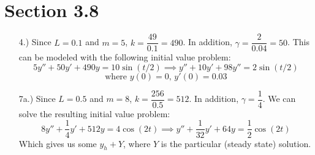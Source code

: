 \documentclass[12pt]{article}
\begin{document}
\section*{Section 3.8}
\begin{itemize}
    \item [4.)] Since $L=0.1$ and $m=5$, $k=\dfrac{49}{0.1}=490$. In addition, $\gamma=\dfrac{2}{0.04}=50$. This can be modeled with the following initial value problem:
    \[5y''+50y'+490y=10\sin(t/2)\implies y''+10y'+98y''=2\sin(t/2)\]
    \[\text{where }y(0)=0,\,y'(0)=0.03\]

    \item [7a.)] Since $L=0.5$ and $m=8$, $k=\dfrac{256}{0.5}=512$. In addition, $\gamma=\dfrac{1}{4}$. We can solve the resulting initial value problem:
    \[8y''+\frac{1}{4}y'+512y=4\cos(2t)\implies y''+\frac{1}{32}y'+64y=\frac{1}{2}\cos(2t)\]
    Which gives us some $y_h+Y$, where $Y$ is the particular (steady state) solution.

\end{itemize}
\end{document}
